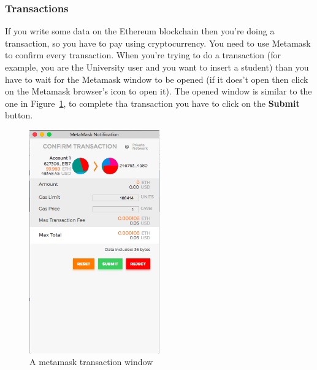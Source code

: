 \subsubsection{Transactions}
If you write some data on the Ethereum blockchain then you're doing a transaction, so you have to pay using cryptocurrency. You need to use Metamask to confirm every transaction. 
When you're trying to do a transaction (for example, you are the University user and you want to insert a student) than you have to wait for the Metamask window to be opened (if it does't open then click on the Metamask browser's icon to open it). The opened window is similar to the one in Figure~\ref{fig:transaction}, to complete tha transaction you have to click on the \textbf{Submit} button.
\begin{figure}[H]
	\centering
	\includegraphics[width=0.50\textwidth]{img/transaction.png}
	\caption{A metamask transaction window}
	\label{fig:transaction}
\end{figure}

